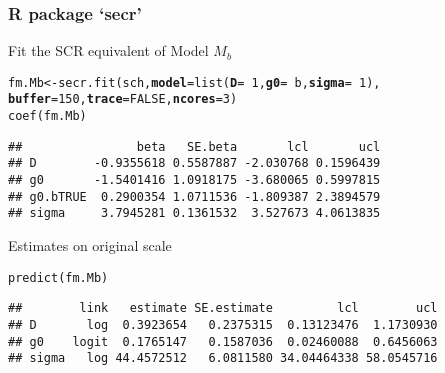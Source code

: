 \documentclass[color=usenames,dvipsnames]{beamer}\usepackage[]{graphicx}\usepackage[]{xcolor}
\makeatletter
\newcommand{\hlnum}[1]{\textcolor[rgb]{0.69,0.494,0}{#1}}%
\newcommand{\hlopt}[1]{\textcolor[rgb]{0,0,0}{#1}}%
\newcommand{\hldef}[1]{\textcolor[rgb]{0,0,0}{#1}}%
\newcommand{\hlkwb}[1]{\textcolor[rgb]{0,0.341,0.682}{#1}}%
\newcommand{\hlkwc}[1]{\textcolor[rgb]{0,0,0}{\textbf{#1}}}%
\newcommand{\hlkwd}[1]{\textcolor[rgb]{0.004,0.004,0.506}{#1}}%
\newenvironment{kframe}{%
 \def\at@end@of@kframe{}%
 \ifinner\ifhmode%
  \def\at@end@of@kframe{\end{minipage}}%
  \begin{minipage}{\columnwidth}%
 \fi\fi%
 \def\FrameCommand##1{\hskip\@totalleftmargin \hskip-\fboxsep
 \colorbox{shadecolor}{##1}\hskip-\fboxsep
     \hskip-\linewidth \hskip-\@totalleftmargin \hskip\columnwidth}%
 \MakeFramed {\advance\hsize-\width
   \@totalleftmargin\z@ \linewidth\hsize
   \@setminipage}}%
 {\par\unskip\endMakeFramed%
 \at@end@of@kframe}
\newenvironment{knitrout}{}{} %
\makeatother
\begin{document}
\begin{frame}[fragile]
  \frametitle{R package `secr'}
  Fit the SCR equivalent of Model $M_b$
\begin{knitrout}\scriptsize
{}\color{fgcolor}\begin{kframe}
\begin{alltt}
\hldef{fm.Mb} \hlkwb{<-} \hlkwd{secr.fit}\hldef{(sch,} \hlkwc{model}\hldef{=}\hlkwd{list}\hldef{(}\hlkwc{D}\hldef{=}\hlopt{~}\hlnum{1}\hldef{,} \hlkwc{g0}\hldef{=}\hlopt{~}\hldef{b,} \hlkwc{sigma}\hldef{=}\hlopt{~}\hlnum{1}\hldef{),}
                  \hlkwc{buffer}\hldef{=}\hlnum{150}\hldef{,} \hlkwc{trace}\hldef{=}\hlnum{FALSE}\hldef{,} \hlkwc{ncores}\hldef{=}\hlnum{3}\hldef{)}
\hlkwd{coef}\hldef{(fm.Mb)}
\end{alltt}
\begin{verbatim}
##                beta   SE.beta       lcl       ucl
## D        -0.9355618 0.5587887 -2.030768 0.1596439
## g0       -1.5401416 1.0918175 -3.680065 0.5997815
## g0.bTRUE  0.2900354 1.0711536 -1.809387 2.3894579
## sigma     3.7945281 0.1361532  3.527673 4.0613835
\end{verbatim}
\end{kframe}
\end{knitrout}
\pause
\vfill
Estimates on original scale
\begin{knitrout}\scriptsize
{}\color{fgcolor}\begin{kframe}
\begin{alltt}
\hlkwd{predict}\hldef{(fm.Mb)}
\end{alltt}
\begin{verbatim}
##        link   estimate SE.estimate         lcl        ucl
## D       log  0.3923654   0.2375315  0.13123476  1.1730930
## g0    logit  0.1765147   0.1587036  0.02460088  0.6456063
## sigma   log 44.4572512   6.0811580 34.04464338 58.0545716
\end{verbatim}
\end{kframe}
\end{knitrout}
\end{frame}
\end{document}
